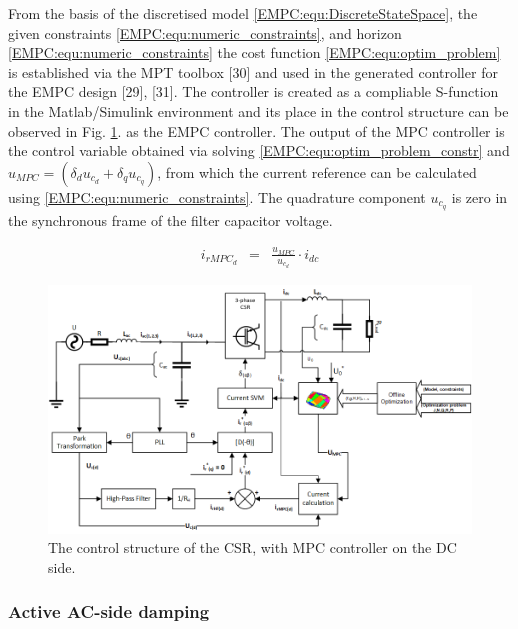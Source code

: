     From the basis of the discretised model \ref{EMPC:equ:DiscreteStateSpace}, the given constraints \ref{EMPC:equ:numeric_constraints}, and horizon \ref{EMPC:equ:numeric_constraints} the cost function \ref{EMPC:equ:optim_problem} is established via the MPT toolbox [30] and used in the generated controller for the EMPC design [29], [31]. The controller is created as a compliable S-function in the Matlab/Simulink environment and its place in the control structure can be observed in Fig. \ref{EMPC:fig:MPCStructure}. as the EMPC controller.
    The output of the MPC controller is the control variable obtained via solving \ref{EMPC:equ:optim_problem_constr} and
    $u_{MPC}=(\delta_du_{c_d}+\delta_qu_{c_q})$, from which the current reference can be calculated using \ref{EMPC:equ:numeric_constraints}. The quadrature component $u_{c_q}$ is zero in the synchronous frame of the filter capacitor voltage.


    \begin{equation}
        \begin{array}{rcl}
            i_{rMPC_{d}}&=&\frac{u_{MPC}}{u_{c_d}}\cdot i_{dc}
        \end{array}
        \label{EMPC:equ:direct_controlval}
    \end{equation}

    \begin{figure}[!ht]
        \centering
        \includegraphics[width=\textwidth]{EMPC_PNG_Pics/MPCStructure.png}
        \caption{The control structure of the CSR, with MPC controller on the DC side.}
        \label{EMPC:fig:MPCStructure}
    \end{figure}

\subsubsection{Active AC-side damping}\label{EMPC:sec:ACdamping}

